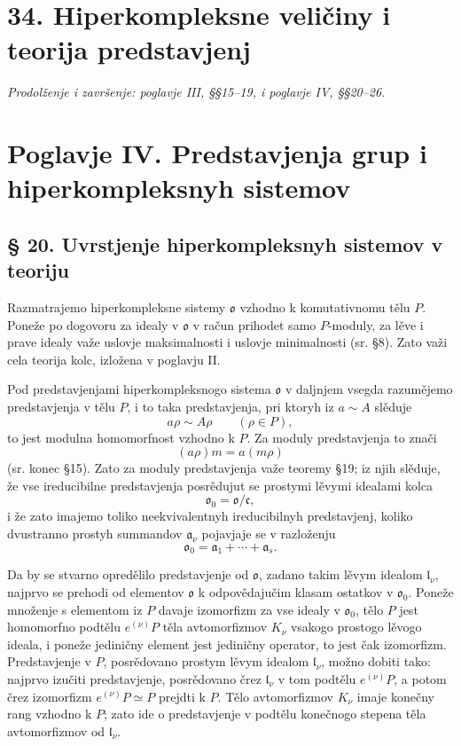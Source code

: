 \documentclass[11pt]{article}
\providecommand{\mo}{\mathfrak{o}}
\providecommand{\ma}{\mathfrak{a}}
\providecommand{\ml}{\mathfrak{l}}
\providecommand{\mc}{\mathfrak{c}}
\begin{document}
\section*{34. Hiperkompleksne veličiny i teorija predstavjenj}
\emph{Prodolženje i završenje: poglavje III, §§15--19, i poglavje IV, §§20--26.}

\section*{Poglavje IV. Predstavjenja grup i hiperkompleksnyh sistemov}

\subsection*{§ 20. Uvrstjenje hiperkompleksnyh sistemov v teoriju}

Razmatrajemo hiperkompleksne sistemy $\mo$ vzhodno k komutativnomu tělu $P$. Poneže po dogovoru za idealy v $\mo$ v račun prihodet samo $P$-moduly, za lěve i prave idealy važe uslovje maksimalnosti i uslovje minimalnosti (sr. §8). Zato važi cela teorija kolc, izložena v poglavju II.

Pod predstavjenjami hiperkompleksnogo sistema $\mo$ v daljnjem vsegda razumějemo predstavjenja v tělu $P$, i to taka predstavjenja, pri ktoryh iz $a\sim A$ slěduje
\[
        a\rho\sim A\rho \qquad(\rho\in P),
\]
to jest modulna homomorfnost vzhodno k $P$. Za moduly predstavjenja to znači
\[
        (a\rho)m=a(m\rho)
\]
(sr. konec §15). Zato za moduly predstavjenja važe teoremy §19; iz njih slěduje, že vse ireducibilne predstavjenja posrědujut se prostymi lěvymi idealami kolca
\[
        \mo_0=\mo/\mc,
\]
i že zato imajemo toliko neekvivalentnyh ireducibilnyh predstavjenj, koliko dvustranno prostyh summandov $\ma_\nu$ pojavjaje se v razloženju
\[
        \mo_0=\ma_1+\cdots+\ma_s.
\]

Da by se stvarno opredělilo predstavjenje od $\mo$, zadano takim lěvym idealom $\ml_\nu$, najprvo se prehodi od elementov $\mo$ k odpovědajučim klasam ostatkov v $\mo_0$. Poneže množenje s elementom iz $P$ davaje izomorfizm za vse idealy v $\mo_0$, tělo $P$ jest homomorfno podtělu $e^{(\nu)}P$ těla avtomorfizmov $K_\nu$ vsakogo prostogo lěvogo ideala, i poneže jediničny element jest jediničny operator, to jest čak izomorfizm. Predstavjenje v $P$, posrědovano prostym lěvym idealom $\ml_\nu$, možno dobiti tako: najprvo izučiti predstavjenje, posrědovano črez $\ml_\nu$ v tom podtělu $e^{(\nu)}P$, a potom črez izomorfizm $e^{(\nu)}P\simeq P$ prejdti k $P$. Tělo avtomorfizmov $K_\nu$ imaje konečny rang vzhodno k $P$; zato ide o predstavjenje v podtělu konečnogo stepena těla avtomorfizmov od $\ml_\nu$.
\end{document}
